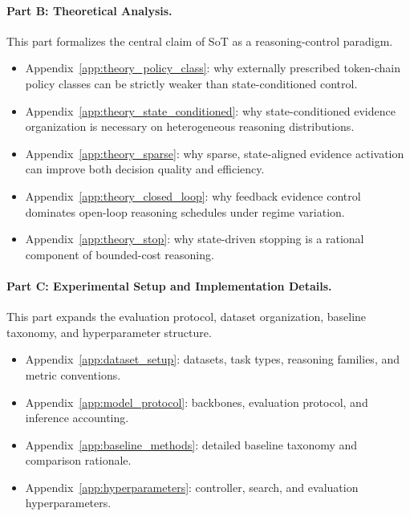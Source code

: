 \paragraph{Part B: Theoretical Analysis.}
This part formalizes the central claim of SoT as a reasoning-control paradigm.
\begin{itemize}[leftmargin=1.6em]
    \item Appendix~\ref{app:theory_policy_class}: why externally prescribed token-chain policy classes can be strictly weaker than state-conditioned control.
    \item Appendix~\ref{app:theory_state_conditioned}: why state-conditioned evidence organization is necessary on heterogeneous reasoning distributions.
    \item Appendix~\ref{app:theory_sparse}: why sparse, state-aligned evidence activation can improve both decision quality and efficiency.
    \item Appendix~\ref{app:theory_closed_loop}: why feedback evidence control dominates open-loop reasoning schedules under regime variation.
    \item Appendix~\ref{app:theory_stop}: why state-driven stopping is a rational component of bounded-cost reasoning.
\end{itemize}

\paragraph{Part C: Experimental Setup and Implementation Details.}
This part expands the evaluation protocol, dataset organization, baseline taxonomy, and hyperparameter structure.
\begin{itemize}[leftmargin=1.6em]
    \item Appendix~\ref{app:dataset_setup}: datasets, task types, reasoning families, and metric conventions.
    \item Appendix~\ref{app:model_protocol}: backbones, evaluation protocol, and inference accounting.
    \item Appendix~\ref{app:baseline_methods}: detailed baseline taxonomy and comparison rationale.
    \item Appendix~\ref{app:hyperparameters}: controller, search, and evaluation hyperparameters.
\end{itemize}

